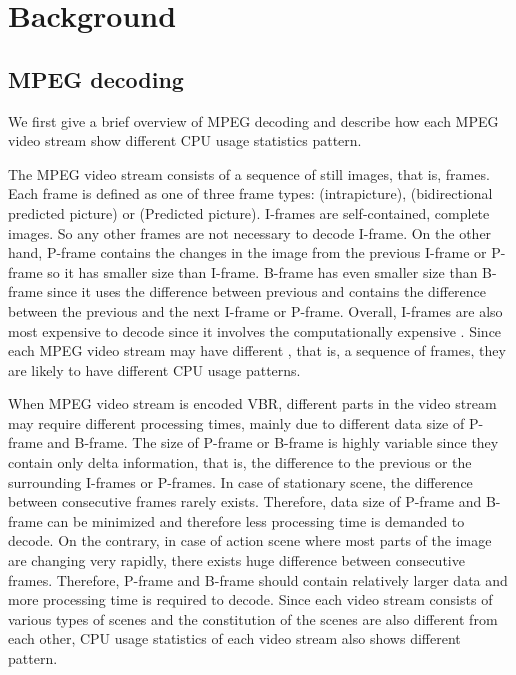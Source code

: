 \section{Background}
\label{sec:background}

\subsection{MPEG decoding}
We first give a brief overview of MPEG decoding and describe how each MPEG video stream show different CPU usage statistics pattern. 

The MPEG video stream consists of a sequence of still images, that is, frames. 
Each frame is defined as one of three frame types:  (intrapicture),  (bidirectional predicted picture) or  (Predicted picture).
I-frames are self-contained, complete images.  
So any other frames are not necessary to decode I-frame.
On the other hand, P-frame contains the changes in the image from the previous I-frame or P-frame so it has smaller size than I-frame.
B-frame has even smaller size than B-frame since it uses the difference between previous and contains the difference between the previous and the next I-frame or P-frame. 
Overall, I-frames are also most expensive to decode since it involves the computationally expensive .
Since each MPEG video stream may have different , that is, a sequence of frames, they are likely to have different CPU usage patterns. 

When MPEG video stream is encoded VBR, different parts in the video stream may require different processing times, mainly due to different data size of P-frame and B-frame. 
The size of P-frame or B-frame is highly variable since they contain only delta information, that is, the difference to the previous or the surrounding I-frames or P-frames.
In case of stationary scene, the difference between consecutive frames rarely exists. 
Therefore, data size of P-frame and B-frame can be minimized and therefore less processing time is demanded to decode. 
On the contrary, in case of action scene where most parts of the image are changing very rapidly, there exists huge difference between consecutive frames. 
Therefore, P-frame and B-frame should contain relatively larger data and more processing time is required to decode.
Since each video stream consists of various types of scenes and the constitution of the scenes are also different from each other, CPU usage statistics of each video stream also shows different pattern. 